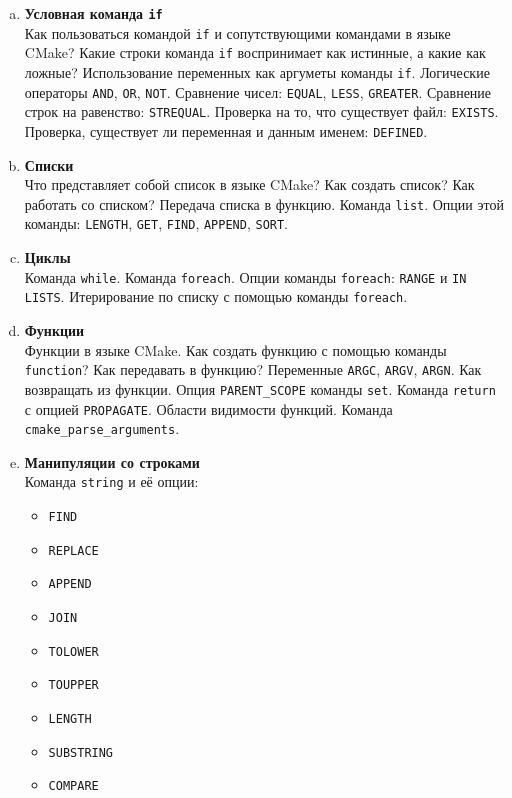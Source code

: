 \documentclass{article}
\begin{document}
\begin{enumerate}
\begin{enumerate}[a.]
\item \textbf{Условная команда \texttt{if}}\\
Как пользоваться командой \texttt{if} и сопутствующими командами в языке CMake? Какие строки команда \texttt{if} воспринимает как истинные, а какие как ложные? Использование переменных как аргуметы команды \texttt{if}. Логические операторы \texttt{AND}, \texttt{OR}, \texttt{NOT}. Сравнение чисел: \texttt{EQUAL},  \texttt{LESS},  \texttt{GREATER}. Сравнение строк на равенство: \texttt{STREQUAL}. Проверка на то, что существует файл: \texttt{EXISTS}. Проверка, существует ли переменная и данным именем: \texttt{DEFINED}.

\item \textbf{Списки}\\
Что представляет собой список в языке CMake? Как создать список? Как работать со списком? Передача списка в функцию. Команда \texttt{list}. Опции этой команды: \texttt{LENGTH}, \texttt{GET}, \texttt{FIND}, \texttt{APPEND}, \texttt{SORT}. 

\item \textbf{Циклы}\\
Команда \texttt{while}. Команда \texttt{foreach}. Опции команды \texttt{foreach}: \texttt{RANGE} и \texttt{IN LISTS}. Итерирование по списку с помощью команды \texttt{foreach}.

\item \textbf{Функции}\\
Функции в языке CMake. Как создать функцию с помощью команды \texttt{function}? Как передавать в функцию? Переменные \texttt{ARGC}, \texttt{ARGV}, \texttt{ARGN}. Как возвращать из функции. Опция \texttt{PARENT\_SCOPE} команды \texttt{set}. Команда \texttt{return} с опцией \texttt{PROPAGATE}. Области видимости функций. Команда \texttt{cmake\_parse\_arguments}.

\item \textbf{Манипуляции со строками}\\
Команда \texttt{string} и её опции:
\begin{multicols}{3}
\begin{itemize}
\item \texttt{FIND}
\item \texttt{REPLACE}
\item \texttt{APPEND}
\item \texttt{JOIN}
\item \texttt{TOLOWER}
\item \texttt{TOUPPER}
\item \texttt{LENGTH}
\item \texttt{SUBSTRING}
\item \texttt{COMPARE}
\end{itemize}
\end{multicols}


\end{enumerate}
\end{enumerate}
\end{document}
